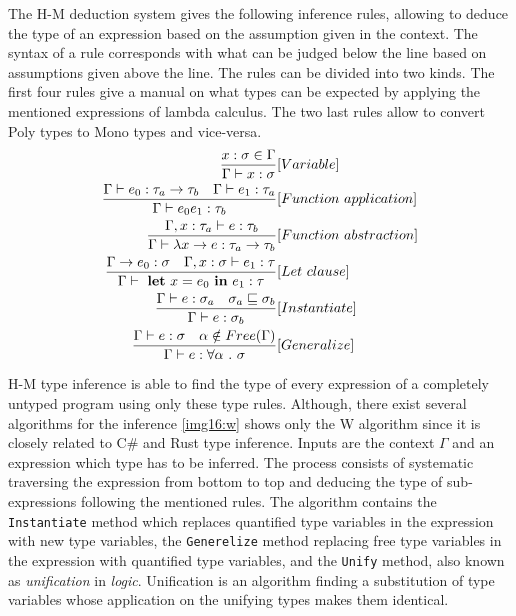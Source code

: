 \par
The H-M deduction system gives the following inference rules, allowing to deduce the type of an expression based on the assumption given in the context. 
The syntax of a rule corresponds with what can be judged below the line based on assumptions given above the line.
The rules can be divided into two kinds.
The first four rules give a manual on what types can be expected by applying the mentioned expressions of lambda calculus. 
The two last rules allow to convert Poly types to Mono types and vice-versa.
\begin{align*}
\frac{x : \sigma \in \Gamma}{\Gamma \vdash x : \sigma}&[Variable]\\
\frac{\Gamma \vdash e_0 : \tau_a \rightarrow \tau_b\ \ \ \Gamma \vdash e_1 : \tau_a}{\Gamma \vdash e_0 e_1 : \tau_b}&[Function\ application]\\
\frac{\Gamma, x : \tau_a \vdash e : \tau_b}{\Gamma \vdash \lambda x \rightarrow e : \tau_a \rightarrow \tau_b}&[Function\ abstraction]\\
\frac{\Gamma \rightarrow e_0 : \sigma \ \ \ \Gamma , x : \sigma \vdash e_1 : \tau}{\Gamma \vdash\ \text{\textbf{let}}\ x = e_0\ \text{\textbf{in}}\ e_1 : \tau}&[Let\ clause]\\
\frac{\Gamma \vdash e : \sigma_a \ \ \ \sigma_a \sqsubseteq \sigma_b}{\Gamma \vdash e : \sigma_b}&[Instantiate]\\
\frac{\Gamma \vdash e : \sigma \ \ \ \alpha \notin Free(\Gamma)}{\Gamma \vdash e : \forall \alpha\ .\ \sigma}&[Generalize]\\
\end{align*}
\par
H-M type inference is able to find the type of every expression of a completely untyped program using only these type rules.
Although, there exist several algorithms for the inference \ref{img16:w} shows only the W algorithm since it is closely related to C\# and Rust type inference.
Inputs are the context $\Gamma$ and an expression which type has to be inferred.
The process consists of systematic traversing the expression from bottom to top and deducing the type of sub-expressions following the mentioned rules.
The algorithm contains the \texttt{Instantiate} method which replaces quantified type variables in the expression with new type variables, the \texttt{Generelize} method replacing free type variables in the expression with quantified type variables, and the \texttt{Unify} method, also known as \textit{unification} in \textit{logic}.
Unification is an algorithm finding a substitution of type variables whose application on the unifying types makes them identical. 
